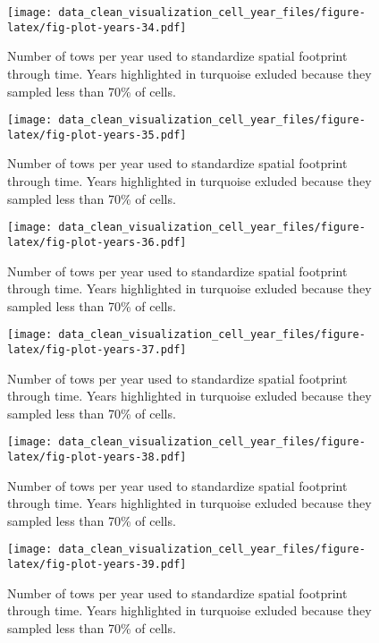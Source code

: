 \documentclass[
]{article}
\begin{document}
\begin{figure}
\centering
\texttt{[image: data\_clean\_visualization\_cell\_year\_files/figure-latex/fig-plot-years-34.pdf]}
\caption{\label{fig:fig-plot-years-34}Number of tows per year used to standardize spatial footprint through time. Years highlighted in turquoise exluded because they sampled less than 70\% of cells.}
\end{figure}

\begin{figure}
\centering
\texttt{[image: data\_clean\_visualization\_cell\_year\_files/figure-latex/fig-plot-years-35.pdf]}
\caption{\label{fig:fig-plot-years-35}Number of tows per year used to standardize spatial footprint through time. Years highlighted in turquoise exluded because they sampled less than 70\% of cells.}
\end{figure}

\begin{figure}
\centering
\texttt{[image: data\_clean\_visualization\_cell\_year\_files/figure-latex/fig-plot-years-36.pdf]}
\caption{\label{fig:fig-plot-years-36}Number of tows per year used to standardize spatial footprint through time. Years highlighted in turquoise exluded because they sampled less than 70\% of cells.}
\end{figure}

\begin{figure}
\centering
\texttt{[image: data\_clean\_visualization\_cell\_year\_files/figure-latex/fig-plot-years-37.pdf]}
\caption{\label{fig:fig-plot-years-37}Number of tows per year used to standardize spatial footprint through time. Years highlighted in turquoise exluded because they sampled less than 70\% of cells.}
\end{figure}

\begin{figure}
\centering
\texttt{[image: data\_clean\_visualization\_cell\_year\_files/figure-latex/fig-plot-years-38.pdf]}
\caption{\label{fig:fig-plot-years-38}Number of tows per year used to standardize spatial footprint through time. Years highlighted in turquoise exluded because they sampled less than 70\% of cells.}
\end{figure}

\begin{figure}
\centering
\texttt{[image: data\_clean\_visualization\_cell\_year\_files/figure-latex/fig-plot-years-39.pdf]}
\caption{\label{fig:fig-plot-years-39}Number of tows per year used to standardize spatial footprint through time. Years highlighted in turquoise exluded because they sampled less than 70\% of cells.}
\end{figure}
\end{document}
